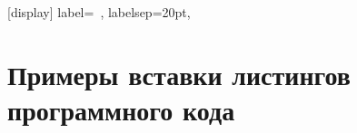\appendix
\sectionformat{\chapter}[display]{%
    label=\appendixname\ \thechapter,%
    labelsep=20pt,
}
\renewcommand\thechapter{\Asbuk{chapter}} %
\chapter{Примеры вставки листингов программного кода} \label{AppendixA}


